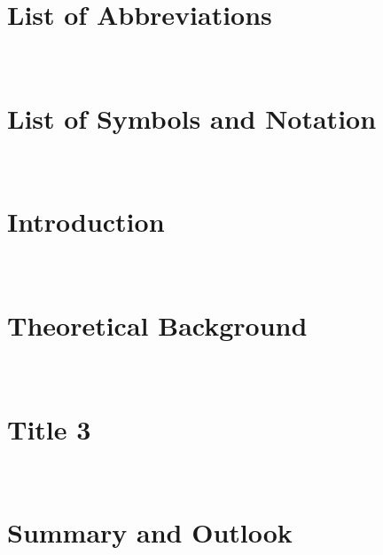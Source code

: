\documentclass[12pt,a4paper]{book}
\begin{document}
\listoftables \newpage
{}
\markboth{}{} %

\newpage \ \newpage

\chapter*{List of Abbreviations}
\printacronyms[name=] \newpage
\newpage \ \newpage

\chapter*{List of Symbols and Notation}
 \newpage

\newpage \ \newpage


\setcounter{page}{1}

\chapter{Introduction}

\label{intro}
\newpage \ \newpage

\chapter{Theoretical Background}
\label{chapter2}

\newpage \ \newpage

\chapter{Title 3}
\label{chapter3}

\newpage \ \newpage

{\chapter{Summary and Outlook}
\label{conclusions}

\markboth{}{} %
\newpage \ \newpage
}
 
\end{document}
